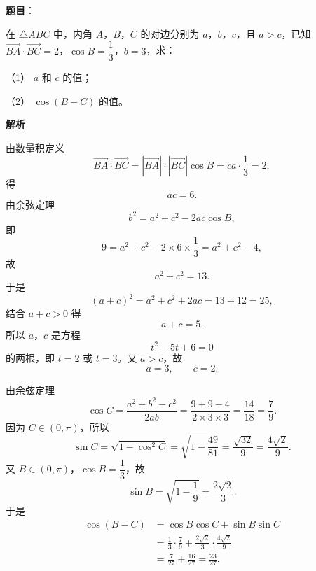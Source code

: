 \begin{answer}

\textbf{题目}：

在 $\triangle ABC$ 中，内角 $A$，$B$，$C$ 的对边分别为 $a$，$b$，$c$，且 $a>c$，已知 $\overrightarrow{BA}\cdot\overrightarrow{BC}=2$，$\cos B=\dfrac13$，$b=3$，求：

（1） $a$ 和 $c$ 的值；

（2） $\cos(B-C)$ 的值。

\textbf{解析}


由数量积定义
\nopagebreak[4]
\[\overrightarrow{BA}\cdot\overrightarrow{BC}=|\overrightarrow{BA}|\cdot|\overrightarrow{BC}|\cos B=ca\cdot\frac13=2,\]
得
\nopagebreak[4]
\[ac=6.\]
由余弦定理
\nopagebreak[4]
\[b^2=a^2+c^2-2ac\cos B,\]
即
\nopagebreak[4]
\[9=a^2+c^2-2\times6\times\frac13=a^2+c^2-4,\]
故
\nopagebreak[4]
\[a^2+c^2=13.\]
于是
\nopagebreak[4]
\[(a+c)^2=a^2+c^2+2ac=13+12=25,\]
结合 $a+c>0$ 得
\nopagebreak[4]
\[a+c=5.\]
所以 $a$，$c$ 是方程
\nopagebreak[4]
\[t^2-5t+6=0\]
的两根，即 $t=2$ 或 $t=3$。又 $a>c$，故
\nopagebreak[4]
\[a=3,\qquad c=2.\]


由余弦定理
\nopagebreak[4]
\[\cos C=\frac{a^2+b^2-c^2}{2ab}=\frac{9+9-4}{2\times3\times3}=\frac{14}{18}=\frac79.\]
因为 $C\in(0,\pi)$，所以
\nopagebreak[4]
\[\sin C=\sqrt{1-\cos^2C}=\sqrt{1-\frac{49}{81}}=\frac{\sqrt{32}}9=\frac{4\sqrt2}9.\]
又 $B\in(0,\pi)$，$\cos B=\dfrac13$，故
\nopagebreak[4]
\[\sin B=\sqrt{1-\frac19}=\frac{2\sqrt2}3.\]
于是
\nopagebreak[4]
\[\begin{aligned}
\cos(B-C)&=\cos B\cos C+\sin B\sin C\\
&=\frac13\cdot\frac79+\frac{2\sqrt2}3\cdot\frac{4\sqrt2}9\\
&=\frac7{27}+\frac{16}{27}=\frac{23}{27}.
\end{aligned}\]



\end{answer}
